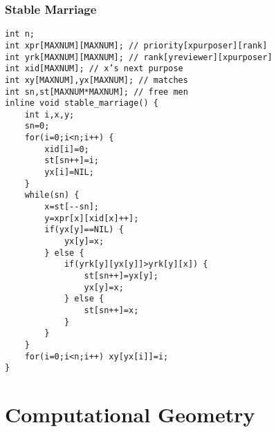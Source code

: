 \documentclass[10pt,twocolumn,oneside]{article}
\begin{document}
\subsubsection{Stable Marriage}
\begin{verbatim}
int n;
int xpr[MAXNUM][MAXNUM]; // priority[xpurposer][rank]
int yrk[MAXNUM][MAXNUM]; // rank[yreviewer][xpurposer]
int xid[MAXNUM]; // x’s next purpose
int xy[MAXNUM],yx[MAXNUM]; // matches
int sn,st[MAXNUM*MAXNUM]; // free men
inline void stable_marriage() {
    int i,x,y;
    sn=0;
    for(i=0;i<n;i++) {
        xid[i]=0;
        st[sn++]=i;
        yx[i]=NIL;
    }
    while(sn) {
        x=st[--sn];
        y=xpr[x][xid[x]++];
        if(yx[y]==NIL) {
            yx[y]=x;
        } else {
            if(yrk[y][yx[y]]>yrk[y][x]) {
                st[sn++]=yx[y];
                yx[y]=x;
            } else {
                st[sn++]=x;
            }
        }
    }
    for(i=0;i<n;i++) xy[yx[i]]=i;
}
\end{verbatim}
\section{Computational Geometry}
\end{document}
